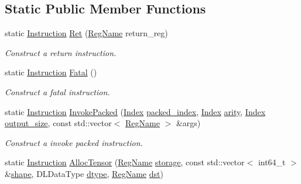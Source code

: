 \subsection*{Static Public Member Functions}
\begin{DoxyCompactItemize}
\item 
static \hyperlink{structtvm_1_1runtime_1_1vm_1_1Instruction}{Instruction} \hyperlink{structtvm_1_1runtime_1_1vm_1_1Instruction_a25ec217ce2afe8decb3d92c716e31c83}{Ret} (\hyperlink{namespacetvm_1_1runtime_1_1vm_a3bbbf700719e9dc3dda2bc25210c18ae}{Reg\+Name} return\+\_\+reg)
\begin{DoxyCompactList}\small\item\em Construct a return instruction. \end{DoxyCompactList}\item 
static \hyperlink{structtvm_1_1runtime_1_1vm_1_1Instruction}{Instruction} \hyperlink{structtvm_1_1runtime_1_1vm_1_1Instruction_a1107060efafaf8af3fba3ec865334946}{Fatal} ()
\begin{DoxyCompactList}\small\item\em Construct a fatal instruction. \end{DoxyCompactList}\item 
static \hyperlink{structtvm_1_1runtime_1_1vm_1_1Instruction}{Instruction} \hyperlink{structtvm_1_1runtime_1_1vm_1_1Instruction_a83bcfbc103e576eac9a225ab1912c1e4}{Invoke\+Packed} (\hyperlink{namespacetvm_1_1runtime_1_1vm_a3597867d2db714bf760876a23d6b7d3d}{Index} \hyperlink{structtvm_1_1runtime_1_1vm_1_1Instruction_ac60e60c96d7bb22d8ac06169d5969232}{packed\+\_\+index}, \hyperlink{namespacetvm_1_1runtime_1_1vm_a3597867d2db714bf760876a23d6b7d3d}{Index} \hyperlink{structtvm_1_1runtime_1_1vm_1_1Instruction_a360b264ed892e620935b648e5a91a5ea}{arity}, \hyperlink{namespacetvm_1_1runtime_1_1vm_a3597867d2db714bf760876a23d6b7d3d}{Index} \hyperlink{structtvm_1_1runtime_1_1vm_1_1Instruction_a6bb6a1b8be0c078394f2336970aab1af}{output\+\_\+size}, const std\+::vector$<$ \hyperlink{namespacetvm_1_1runtime_1_1vm_a3bbbf700719e9dc3dda2bc25210c18ae}{Reg\+Name} $>$ \&args)
\begin{DoxyCompactList}\small\item\em Construct a invoke packed instruction. \end{DoxyCompactList}\item 
static \hyperlink{structtvm_1_1runtime_1_1vm_1_1Instruction}{Instruction} \hyperlink{structtvm_1_1runtime_1_1vm_1_1Instruction_ad7d69fff7d1f2acae7f7c802f1360ec4}{Alloc\+Tensor} (\hyperlink{namespacetvm_1_1runtime_1_1vm_a3bbbf700719e9dc3dda2bc25210c18ae}{Reg\+Name} \hyperlink{structtvm_1_1runtime_1_1vm_1_1Instruction_a3412cabd3b4f42f106f56fc22257f6ca}{storage}, const std\+::vector$<$ int64\+\_\+t $>$ \&\hyperlink{structtvm_1_1runtime_1_1vm_1_1Instruction_a1354fe84e9c14c550a53f5de8f48d968}{shape}, D\+L\+Data\+Type \hyperlink{structtvm_1_1runtime_1_1vm_1_1Instruction_a91614b450055e58850c47949b3ed2714}{dtype}, \hyperlink{namespacetvm_1_1runtime_1_1vm_a3bbbf700719e9dc3dda2bc25210c18ae}{Reg\+Name} \hyperlink{structtvm_1_1runtime_1_1vm_1_1Instruction_a17f056cc4798d31c8bcee6903be8dd1d}{dst})

\end{DoxyCompactItemize}
